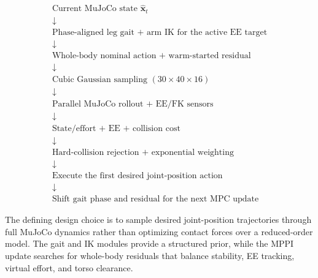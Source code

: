 \documentclass[11pt,a4paper]{article}
\begin{document}
\begin{equation*}
\boxed{
\begin{array}{c}
\text{Current MuJoCo state }\hat{\bm{x}}_t\\
\downarrow\\
\text{Phase-aligned leg gait + arm IK for the active EE target}\\
\downarrow\\
\text{Whole-body nominal action + warm-started residual}\\
\downarrow\\
\text{Cubic Gaussian sampling }(30\times40\times16)\\
\downarrow\\
\text{Parallel MuJoCo rollout + EE/FK sensors}\\
\downarrow\\
\text{State/effort + EE + collision cost}\\
\downarrow\\
\text{Hard-collision rejection + exponential weighting}\\
\downarrow\\
\text{Execute the first desired joint-position action}\\
\downarrow\\
\text{Shift gait phase and residual for the next MPC update}
\end{array}}
\end{equation*}

The defining design choice is to sample desired joint-position trajectories
through full MuJoCo dynamics rather than optimizing contact forces over a
reduced-order model. The gait and IK modules provide a structured prior, while
the MPPI update searches for whole-body residuals that balance stability, EE
tracking, virtual effort, and torso clearance.
\end{document}
